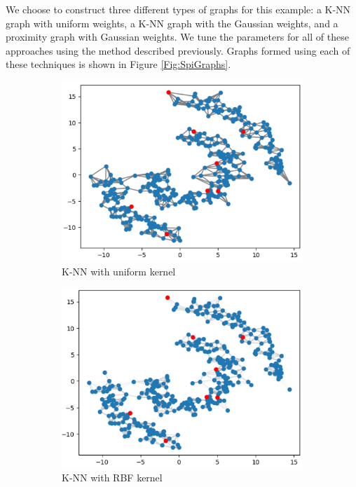 \documentclass[12pt]{amsart}
\begin{document}
We choose to construct three different types of graphs for this example: a K-NN graph with uniform weights, a K-NN graph with the Gaussian weights, and a proximity graph with Gaussian weights. We tune the parameters for all of these approaches using the method described previously. Graphs formed using each of these techniques is shown in Figure \ref{Fig:SpiGraphs}.
    \begin{figure}[ht] 
  \begin{subfigure}{0.475\linewidth}
    \centering
    \includegraphics[width=0.8\linewidth]{Figures/SpiKNNUni.png} 
    \caption{K-NN with uniform kernel} 
    \label{Fig:SpiKNNUni}
  \end{subfigure}%
  \begin{subfigure}{0.475\linewidth}
    \centering
    \includegraphics[width=0.8\linewidth]{Figures/SpiKNNRBF.png} 
    \caption{K-NN with RBF kernel} 
    \label{Fig:SpiKNNRBF}
  \end{subfigure} 
    \begin{subfigure}{0.475\linewidth}
    \centering

\end{subfigure}
\end{figure}
\end{document}
